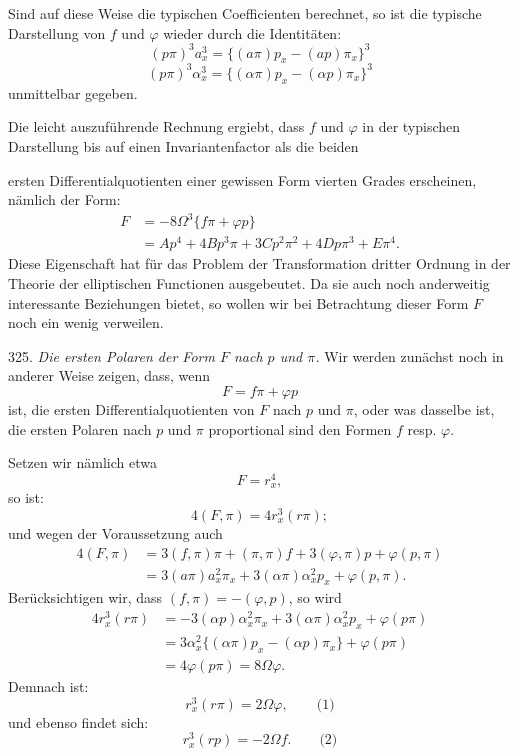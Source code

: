 Sind auf diese Weise die typischen Coefficienten berechnet, so ist die
typische Darstellung von $f$ und $\varphi$ wieder durch die
Identitäten:
\[
(p\pi)^3a_x^3=\{(a\pi)p_x-(ap)\pi_x\}^3
\]
\[
(p\pi)^3\alpha_x^3=\{(\alpha\pi)p_x-(\alpha p)\pi_x\}^3
\]
unmittelbar gegeben.

Die leicht auszuführende Rechnung ergiebt, dass $f$ und $\varphi$ in
der typischen Darstellung bis auf einen Invariantenfactor als die
beiden



ersten Differentialquotienten einer gewissen Form vierten Grades
erscheinen, nämlich der Form:
\[
\begin{aligned}
F&=-8\Omega^3\{f\pi+\varphi p\}\\
&=Ap^4+4Bp^3\pi+3Cp^2\pi^2+4Dp\pi^3+E\pi^4.
\end{aligned}
\]
Diese Eigenschaft hat  für das Problem der
Transformation dritter Ordnung in der Theorie der elliptischen
Functionen ausgebeutet. Da sie auch noch anderweitig interessante
Beziehungen bietet, so wollen wir bei Betrachtung dieser Form $F$ noch
ein wenig verweilen.

325. \textit{Die ersten Polaren der Form $F$ nach $p$ und $\pi$.} Wir
werden zunächst noch in anderer Weise zeigen, dass, wenn
\[
F=f\pi+\varphi p
\]
ist, die ersten Differentialquotienten von $F$ nach $p$ und $\pi$,
oder was dasselbe ist, die ersten Polaren nach $p$ und $\pi$
proportional sind den Formen $f$ resp. $\varphi$.

Setzen wir nämlich etwa
\[
F=r_x^4,
\]
so ist:
\[
4(F,\pi)=4r_x^3(r\pi);
\]
und wegen der Voraussetzung auch
\[
\begin{aligned}
4(F,\pi)&=3(f,\pi)\pi+(\pi,\pi)f+3(\varphi,\pi)p+\varphi(p,\pi)\\
&=3(a\pi)a_x^2\pi_x+3(\alpha\pi)\alpha_x^2p_x+\varphi(p,\pi).
\end{aligned}
\]
Berücksichtigen wir, dass $(f,\pi)=-(\varphi,p)$, so wird
\[
\begin{aligned}
4r_x^3(r\pi)&=-3(\alpha p)\alpha_x^2\pi_x+3(\alpha\pi)\alpha_x^2p_x+\varphi(p\pi)\\
&=3\alpha_x^2\{(\alpha\pi)p_x-(\alpha p)\pi_x\}+\varphi(p\pi)\\
&=4\varphi(p\pi)=8\Omega\varphi.
\end{aligned}
\]
Demnach ist:
\[
r_x^3(r\pi)=2\Omega\varphi,\qquad\text{(1)}
\]
und ebenso findet sich:
\[
r_x^3(rp)=-2\Omega f.\qquad\text{(2)}
\]

